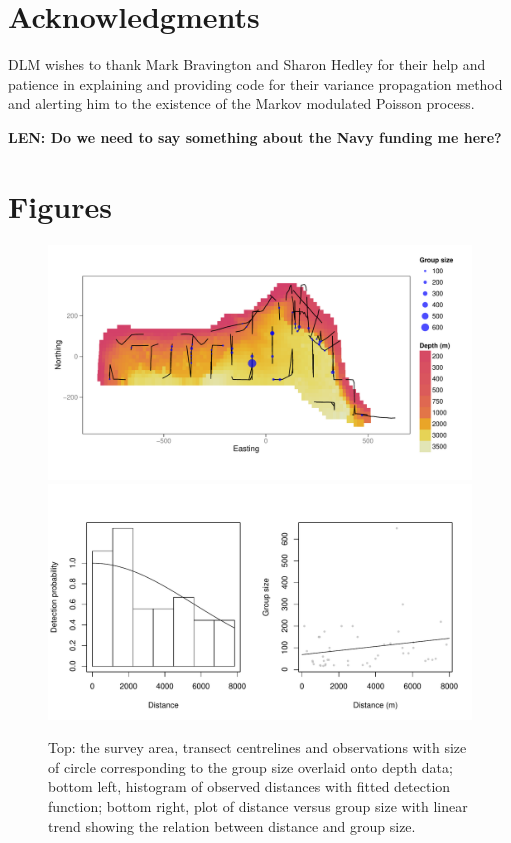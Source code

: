 \documentclass[a4paper,12pt]{article}
\begin{document}
\section*{Acknowledgments}

DLM wishes to thank Mark Bravington and Sharon Hedley for their help and patience in explaining and providing code for their variance propagation method and alerting him to the existence of the Markov modulated Poisson process.

\textbf{LEN: Do we need to say something about the Navy funding me here?}


\newpage



\newpage


\newpage


\section*{Figures}

\begin{figure}[h!]
  \caption{Top: the survey area, transect centrelines and observations with size of circle corresponding to the group size overlaid onto depth data; bottom left, histogram of observed distances with fitted detection function; bottom right, plot of distance versus group size with linear trend showing the relation between distance and group size.}
  \label{dolphin-eda}
  \begin{center}
    \includegraphics[width=\textwidth]{figs/depth-transects}\\
        \includegraphics[width=\textwidth]{figs/distances-groups}
  \end{center}
\end{figure}
\end{document}

